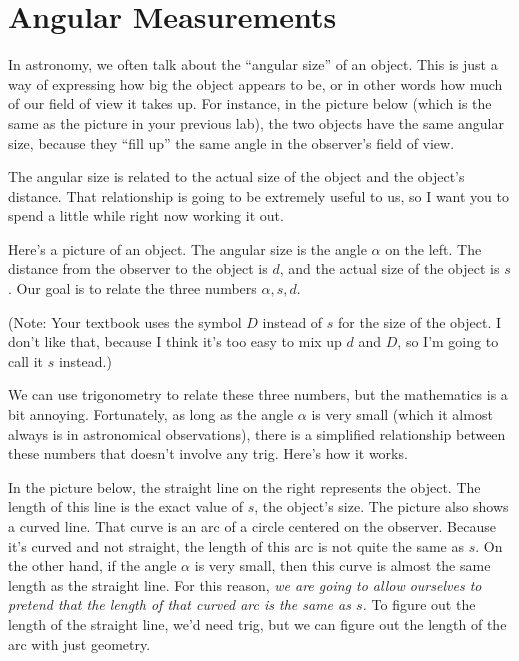 \chapter{Angular Measurements}


In astronomy, we often talk about the ``angular size'' of an object.
This is just a way of expressing how big the object appears to be, or
in other words how much of our field of view it takes up.  For
instance, in the picture below (which is the same as the picture in
your previous lab), the two objects have the same angular size,
because they ``fill up'' the same angle in the observer's
field of view.

\medskip
\centerline{\epsfxsize 6in}
\medskip

The angular size is related to the actual size of the object and the
object's distance.  That relationship is going to be extremely useful
to us, so I want you to spend a little while right now working it out.

Here's a picture of an object.  The angular size is the angle $\alpha$
on the left.  The distance from the observer to the object is $d$, and
the actual size of the object is $s$.  Our goal is to relate the
three numbers $\alpha,s,d$.

\medskip
\centerline{}
\medskip

(Note: Your textbook uses the symbol $D$ instead of $s$ for
the size of the object.  I don't like that, because I think it's
too easy to mix up $d$ and $D$, so I'm going to call it $s$ instead.)

We can use trigonometry to relate these three numbers, but the
mathematics is a bit annoying.  Fortunately, as long as the angle
$\alpha$ is very small (which it almost always is
in astronomical observations), there is a simplified
relationship between these numbers that doesn't involve
any trig.  Here's how it works.

In the picture below, the straight line on the right
represents the
object.  The length of this line is the exact value of $s$, the object's
size.  The picture also shows a curved line.  That curve is an arc
of a circle centered on the observer.  Because it's curved and not straight,
the length of this arc is not quite the same as $s$.  On the other hand,
if the angle $\alpha$ is very small, then this curve is almost the same
length as the straight line.  For this reason, {\it we are going to allow
ourselves to pretend that the length of that curved arc is the
same as $s$.}  To figure out the length of the straight line, we'd
need trig, but we can figure out the length of the arc with just
geometry.



